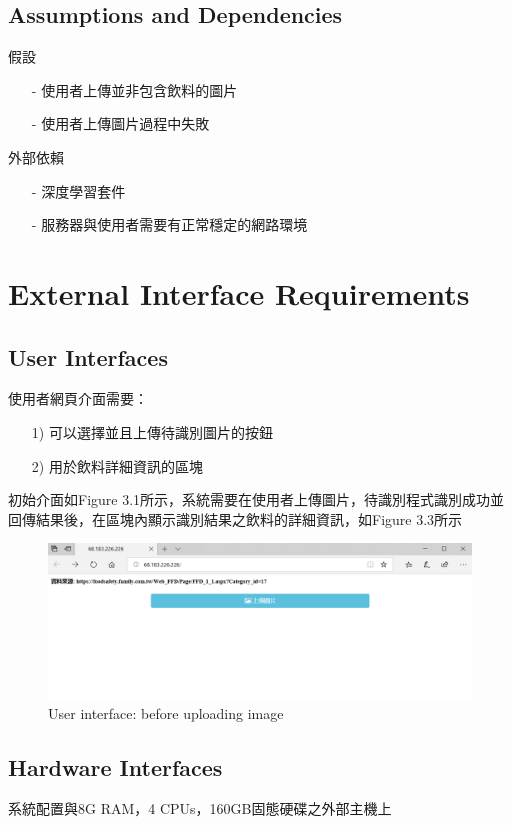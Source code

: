 \documentclass{scrreprt}
\begin{document}
\begin{CJK}{UTF8}{bkai}
\section{Assumptions and Dependencies}
假設
\begin{itemize}
\item[-] 使用者上傳並非包含飲料的圖片
\item[-] 使用者上傳圖片過程中失敗
\end{itemize}
外部依賴
\begin{itemize}
\item[-] 深度學習套件
\item[-] 服務器與使用者需要有正常穩定的網路環境
\end{itemize}

\chapter{External Interface Requirements}

\section{User Interfaces}
使用者網頁介面需要：
\begin{itemize}
\item [1)]  可以選擇並且上傳待識別圖片的按鈕
\item [2)]  用於飲料詳細資訊的區塊
\end{itemize}
初始介面如Figure 3.1所示，系統需要在使用者上傳圖片，待識別程式識別成功並回傳結果後，在區塊內顯示識別結果之飲料的詳細資訊，如Figure 3.3所示

\begin{figure}[ht]
\begin{center}
\includegraphics[width=14cm]{userinterface1.png}
\end{center}
\caption{User interface: before uploading image}
\label{fig:1}
\end{figure}


\section{Hardware Interfaces}
系統配置與8G RAM，4 CPUs，160GB固態硬碟之外部主機上

\end{CJK}
\end{document}
